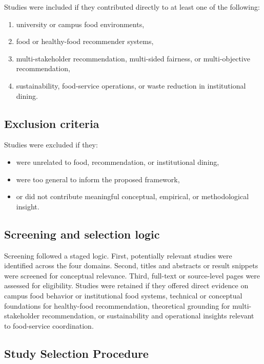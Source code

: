 \documentclass[
  letterpaper,
  DIV=11,
  numbers=noendperiod]{scrartcl}
\providecommand{\tightlist}{%
  \setlength{\itemsep}{0pt}\setlength{\parskip}{0pt}}
\begin{document}
Studies were included if they contributed directly to at least one of
the following:

\begin{enumerate}
\def\labelenumi{\arabic{enumi}.}
\tightlist
\item
  university or campus food environments,
\item
  food or healthy-food recommender systems,
\item
  multi-stakeholder recommendation, multi-sided fairness, or
  multi-objective recommendation,
\item
  sustainability, food-service operations, or waste reduction in
  institutional dining.
\end{enumerate}

\subsection{Exclusion criteria}\label{exclusion-criteria}

Studies were excluded if they:

\begin{itemize}
\tightlist
\item
  were unrelated to food, recommendation, or institutional dining,
\item
  were too general to inform the proposed framework,
\item
  or did not contribute meaningful conceptual, empirical, or
  methodological insight.
\end{itemize}

\subsection{Screening and selection
logic}\label{screening-and-selection-logic}

Screening followed a staged logic. First, potentially relevant studies
were identified across the four domains. Second, titles and abstracts or
result snippets were screened for conceptual relevance. Third, full-text
or source-level pages were assessed for eligibility. Studies were
retained if they offered direct evidence on campus food behavior or
institutional food systems, technical or conceptual foundations for
healthy-food recommendation, theoretical grounding for multi-stakeholder
recommendation, or sustainability and operational insights relevant to
food-service coordination.

\subsection{Study Selection Procedure}\label{study-selection-procedure}
\end{document}
